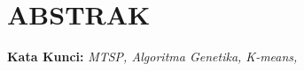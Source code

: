 \newpage
\chapter*{ABSTRAK}


\noindent \textbf{Kata Kunci:} \textit{MTSP, Algoritma Genetika, K-means,}